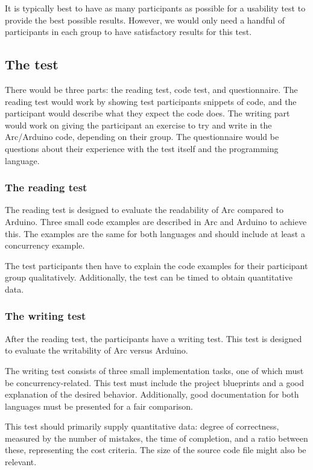 It is typically best to have as many participants as possible for a usability test to provide the best possible results. However, we would only need a handful of participants in each group to have satisfactory results for this test.

\subsection{The test}\label{subsubsec:theTestSession}
There would be three parts: the reading test, code test, and questionnaire. The reading test would work by showing test participants snippets of code, and the participant would describe what they expect the code does. The writing part would work on giving the participant an exercise to try and write in the Arc/Arduino code, depending on their group. The questionnaire would be questions about their experience with the test itself and the programming language. 

\subsubsection{The reading test}
The reading test is designed to evaluate the readability of Arc compared to Arduino. Three small code examples are described in Arc and Arduino to achieve this. The examples are the same for both languages and should include at least a concurrency example. 

The test participants then have to explain the code examples for their participant group qualitatively. Additionally, the test can be timed to obtain quantitative data. 

\subsubsection{The writing test}
After the reading test, the participants have a writing test. This test is designed to evaluate the writability of Arc versus Arduino. 

The writing test consists of three small implementation tasks, one of which must be concurrency-related. This test must include the project blueprints and a good explanation of the desired behavior. Additionally, good documentation for both languages must be presented for a fair comparison. 

This test should primarily supply quantitative data: degree of correctness, measured by the number of mistakes, the time of completion, and a ratio between these, representing the cost criteria. The size of the source code file might also be relevant. 

